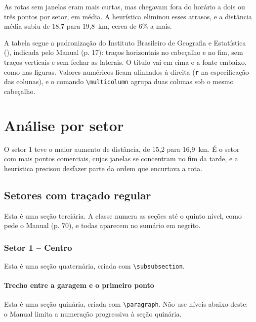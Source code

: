\documentclass[eq,capa]{texufpel}
\begin{document}
As rotas sem janelas eram mais curtas, mas chegavam fora do horário a dois ou
três pontos por setor, em média. A heurística eliminou esses atrasos, e a
distância média subiu de 18,7 para 19,8~km, cerca de 6\% a mais.

A tabela segue a padronização do Instituto Brasileiro de Geografia e
Estatística (),
indicada pelo Manual (p. 17): traços
horizontais no cabeçalho e no fim, sem traços verticais e sem fechar as
laterais. O título vai em cima e a fonte embaixo, como nas figuras. Valores
numéricos ficam alinhados à direita (\texttt{r} na especificação das
colunas), e o comando \verb|\multicolumn| agrupa duas colunas sob o mesmo
cabeçalho.

\section{Análise por setor}

O setor 1 teve o maior aumento de distância, de 15,2 para 16,9~km. É o setor
com mais pontos comerciais, cujas janelas se concentram no fim da tarde, e a
heurística precisou desfazer parte da ordem que encurtava a rota.

\subsection{Setores com traçado regular}

Esta é uma seção terciária. A classe numera as seções até o quinto nível,
como pede o Manual (p. 70), e todas aparecem no sumário em negrito.

\subsubsection{Setor 1 -- Centro}

Esta é uma seção quaternária, criada com \verb|\subsubsection|.

\paragraph{Trecho entre a garagem e o primeiro ponto}

Esta é uma seção quinária, criada com \verb|\paragraph|. Não use níveis abaixo
deste: o Manual limita a numeração progressiva à seção quinária.
\end{document}
